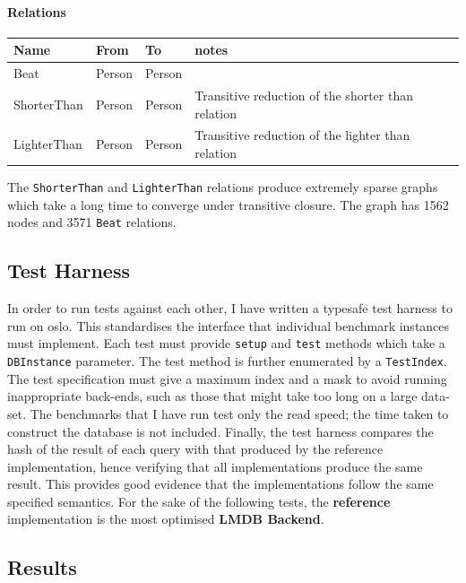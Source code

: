 \documentclass[12pt,a4paper,twoside,openright]{report}
\newcommand\codeName[1]{\texttt{#1}}
\begin{document}
\paragraph{Relations}
\begin{center}
	\begin{tabular}{ |p{3cm}|| p{2cm}| p{2cm}||p{3cm}|}
	\hline
		Name &  From & To & notes \\ \hline
		Beat & Person & Person & \\ \hline
		ShorterThan &  Person & Person & Transitive reduction of the shorter than relation \\ \hline
		LighterThan & Person & Person & Transitive reduction of the lighter than relation \\ \hline

	\end{tabular}
\end{center}
		
		The \codeName{ShorterThan} and \codeName{LighterThan} relations produce extremely sparse graphs which take a long time to converge under transitive closure. The graph has 1562 nodes and 3571 \codeName{Beat} relations.
	\subsection{Test Harness}
	In order to run tests against each other, I have written a typesafe test harness to run on oslo. This standardises the interface that individual benchmark instances must implement. Each test must provide  \codeName{setup} and \codeName{test} methods which take a \codeName{DBInstance} parameter. The test method is further enumerated by a \codeName{TestIndex}. The test specification must give a maximum index and a mask to avoid running inappropriate back-ends, such as those that might take too long on a large data-set. The benchmarks that I have run test only the read speed; the time taken to construct the database is not included. Finally, the test harness compares the hash of the result of each query with that produced by the reference implementation, hence verifying that all implementations produce the same result. This provides good evidence that the implementations follow the same specified semantics. For the sake of the following tests, the \textbf{reference} implementation is the most optimised \textbf{LMDB Backend}.
	
	\subsection{Results}
\end{document}
